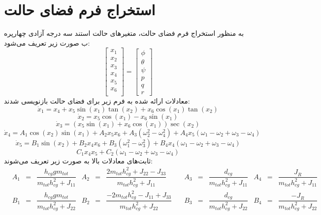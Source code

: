 \section{استخراج فرم فضای حالت}
به منظور استخراج فرم فضای حالت، متغیرهای حالت استند سه درجه آزادی چهارپره ب صورت زیر تعریف می‌شود:
\begin{equation}
	\begin{bmatrix}
		x_1\\x_2\\x_3\\x_4\\x_5\\x_6\\
	\end{bmatrix} = 
\begin{bmatrix}
	\phi\\ \theta \\ \psi \\ p\\ q\\ r
\end{bmatrix}
\end{equation}
معادلات ارائه شده به فرم زیر برای فضای حالت بازنویسی شدند:
\begin{equation}
	\dot x_1 = x_4 + x_5\sin(x_1)\tan(x_2) + x_6\cos(x_1)\tan(x_2)
\end{equation}
\begin{equation}
	\dot x_2 = x_5\cos(x_1)- x_6\sin(x_1)
\end{equation}
\begin{equation}
	\dot x_3 = (x_5\sin(x_1) + x_6\cos(x_1))\sec(x_2)
\end{equation}
\begin{equation}
	\dot x_4 = A_1\cos(x_2)\sin(x_1) + 
	A_2x_5x_6 + A_3\left(\omega_2^2-\omega_4^2\right)+
	A_4x_5\left(\omega_1-\omega_2+\omega_3-\omega_4\right)
\end{equation}
\begin{equation}
	\dot x_5 = B_1\sin(x_2) + 
	B_2x_4x_6 + B_3\left(\omega_1^2-\omega_3^2\right)+
	B_4x_4\left(\omega_1-\omega_2+\omega_3-\omega_4\right)
\end{equation}
\begin{equation}
	C_1x_4x_5 + 
	C_2\left(\omega_1-\omega_2+\omega_3-\omega_4\right)
\end{equation}
ثابت‌های معادلات بالا  به صورت زیر تعریف می‌شوند:
\begin{align*}
	&A_1& =& \dfrac{h_{cg}gm_{tot}}{m_{tot}h_{cg}^2+J_{11}}
	&A_2& =& \dfrac{2m_{tot}h_{cg}^2+J_{22}-J_{33}}{m_{tot}h_{cg}^2+J_{11}}\quad
	&A_3& =& \dfrac{d_{cg}}{m_{tot}h_{cg}^2+J_{11}}
	&A_4& = &\dfrac{J_R}{m_{tot}h_{cg}^2+J_{11}}\\
	&B_1& =& \dfrac{h_{cg}gm_{tot}}{m_{tot}h_{cg}^2+J_{22}}
	&B_2& =& \dfrac{-2m_{tot}h_{cg}^2-J_{11}+J_{33}}{m_{tot}h_{cg}^2+J_{22}}\quad
	&B_3& =& \dfrac{d_{cg}}{m_{tot}h_{cg}^2+J_{22}}
	&B_4& = &\dfrac{-J_R}{m_{tot}h_{cg}^2+J_{22}}
\end{align*}
